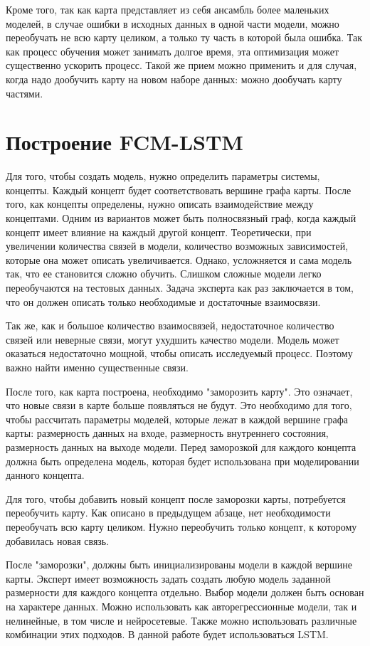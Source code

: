 Кроме того, так как карта представляет из себя ансамбль
более маленьких моделей, в случае ошибки в исходных данных
в одной части модели, можно переобучать не всю карту целиком,
а только ту часть в которой была ошибка. Так как процесс обучения
может занимать долгое время, эта оптимизация может существенно ускорить процесс.
Такой же прием можно применить и для случая, когда надо дообучить карту на
новом наборе данных: можно дообучать карту частями.

\section{Построение FCM-LSTM}

Для того, чтобы создать модель, нужно определить параметры системы, концепты.
Каждый концепт будет соответствовать вершине графа карты.
После того, как концепты определены, нужно описать взаимодействие между концептами.
Одним из вариантов может быть полносвязный граф, когда каждый концепт имеет
влияние на каждый другой концепт. Теоретически, при увеличении количества
связей в модели, количество возможных зависимостей, которые она может описать
увеличивается. Однако, усложняется и сама модель так, что ее становится сложно обучить.
Слишком сложные модели легко переобучаются на тестовых данных.
Задача эксперта как раз заключается в том, что он должен
описать только необходимые и достаточные взаимосвязи.

Так же, как и большое количество взаимосвязей,
недостаточное количество связей или неверные связи, могут ухудшить
качество модели. Модель может оказаться недостаточно мощной, чтобы описать
исследуемый процесс. Поэтому важно найти именно существенные связи.

После того, как карта построена, необходимо "заморозить карту".
Это означает, что новые связи в карте больше появляться не будут.
Это необходимо для того, чтобы рассчитать параметры моделей, которые
лежат в каждой вершине графа карты: размерность данных на входе,
размерность внутреннего состояния, размерность данных на выходе модели.
Перед заморозкой для каждого концепта должна быть определена модель,
которая будет использована при моделировании данного концепта.

Для того, чтобы добавить новый концепт после заморозки карты,
потребуется переобучить карту. Как описано в предыдущем абзаце,
нет необходимости переобучать всю карту целиком. Нужно переобучить только
концепт, к которому добавилась новая связь.

После "заморозки", должны быть инициализированы модели в каждой вершине
карты. Эксперт имеет возможность задать создать любую модель заданной размерности
для каждого концепта отдельно. Выбор модели должен быть основан
на характере данных. Можно использовать как авторегрессионные модели,
так и нелинейные, в том числе и нейросетевые. Также можно использовать различные комбинации
этих подходов. В данной работе будет использоваться LSTM.

